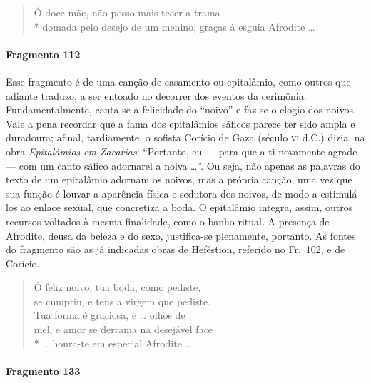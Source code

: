 \begin{verse}
Ó doce mãe, não posso mais tecer a trama --- \\*
domada pelo desejo de um menino, graças à \qb{}esguia Afrodite \ldots{}
\end{verse}


\paragraph{Fragmento 112}

{\small Esse fragmento é de uma canção de casamento ou epitalâmio, como outros que
adiante traduzo, a ser entoado no decorrer dos eventos da cerimônia.
Fundamentalmente, canta-se a felicidade do ``noivo” e faz-se o elogio
dos noivos. Vale a pena recordar que a fama dos epitalâmios sáficos parece ter
sido ampla e duradoura; afinal, tardiamente, o sofista Corício de Gaza (século
\textsc{vi} d.C.) dizia, na obra \textit{Epitalâmios em Zacarias}: ``Portanto, eu
--- para que a ti novamente agrade --- com um canto sáfico adornarei a noiva \ldots{}”.
Ou seja, não apenas as palavras do texto de um epitalâmio adornam os noivos,
mas a própria canção, uma vez que sua função é louvar a aparência física e
sedutora dos noivos, de modo a estimulá-los ao enlace sexual, que concretiza a
boda. O epitalâmio integra, assim, outros recursos voltados à mesma finalidade,
como o banho ritual. A presença de Afrodite, deusa da beleza e do sexo,
justifica-se plenamente, portanto. As fontes do fragmento são as já indicadas
obras de Heféstion, referido no Fr.~102, e de Corício.}

\begin{verse}
Ó feliz noivo, tua boda, como pediste,\\
se cumpriu, e tens a virgem que pediste.\\
Tua forma é graciosa, e \ldots{} olhos de\\
mel, e amor se derrama na desejável face\\*
\ldots{} honra-te em especial Afrodite \ldots{}
\end{verse}

\paragraph{Fragmento 133}

